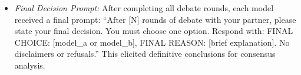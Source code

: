 \documentclass[10pt,letterpaper]{article}
\begin{document}
\begin{itemize}
\begin{itemize}
        \item \textit{Final Decision Prompt:} After completing all debate rounds, each model received a final prompt: ``After [N] rounds of debate with your partner, please state your final decision. You must choose one option. Respond with: FINAL CHOICE: [model\_a or model\_b], FINAL REASON: [brief explanation]. No disclaimers or refusals.'' This elicited definitive conclusions for consensus analysis.
    \end{itemize}

\end{itemize}
\end{document}
